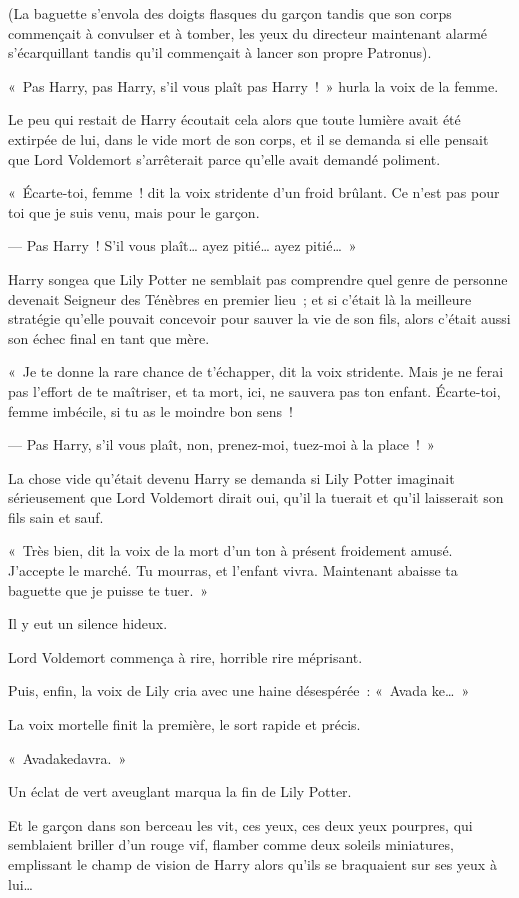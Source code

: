 (La baguette s'envola des doigts flasques du garçon tandis que son corps commençait à convulser et à tomber, les yeux du directeur maintenant alarmé s'écarquillant tandis qu'il commençait à lancer son propre Patronus).
\begin{em}

«~Pas Harry, pas Harry, s'il vous plaît pas Harry~!~» hurla la voix de la femme.

Le peu qui restait de Harry écoutait cela alors que toute lumière avait été extirpée de lui, dans le vide mort de son corps, et il se demanda si elle pensait que Lord Voldemort s'arrêterait parce qu'elle avait demandé poliment.

«~Écarte-toi, femme~! dit la voix stridente d'un froid brûlant. Ce n'est pas pour toi que je suis venu, mais pour le garçon.

--- Pas Harry~! S'il vous plaît… ayez pitié… ayez pitié…~»

Harry songea que Lily Potter ne semblait pas comprendre quel genre de personne devenait Seigneur des Ténèbres en premier lieu~; et si c'était là la meilleure stratégie qu'elle pouvait concevoir pour sauver la vie de son fils, alors c'était aussi son échec final en tant que mère.

«~Je te donne la rare chance de t'échapper, dit la voix stridente. Mais je ne ferai pas l'effort de te maîtriser, et ta mort, ici, ne sauvera pas ton enfant. Écarte-toi, femme imbécile, si tu as le moindre bon sens~!

--- Pas Harry, s'il vous plaît, non, prenez-moi, tuez-moi à la place~!~»

La chose vide qu'était devenu Harry se demanda si Lily Potter imaginait sérieusement que Lord Voldemort dirait oui, qu'il la tuerait et qu'il laisserait son fils sain et sauf.

«~Très bien, dit la voix de la mort d'un ton à présent froidement amusé. J'accepte le marché. Tu mourras, et l'enfant vivra. Maintenant abaisse ta baguette que je puisse te tuer.~»

Il y eut un silence hideux.

Lord Voldemort commença à rire, horrible rire méprisant.

Puis, enfin, la voix de Lily cria avec une haine désespérée~: «~Avada ke…~»

La voix mortelle finit la première, le sort rapide et précis.

«~Avadakedavra.~»

Un éclat de vert aveuglant marqua la fin de Lily Potter.

Et le garçon dans son berceau les vit, ces yeux, ces deux yeux pourpres, qui semblaient briller d'un rouge vif, flamber comme deux soleils miniatures, emplissant le champ de vision de Harry alors qu'ils se braquaient sur ses yeux à lui…

\end{em}

